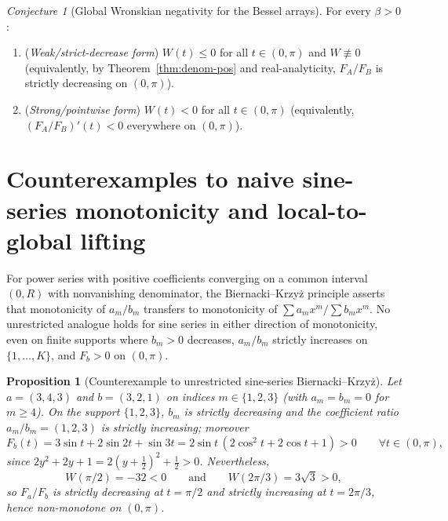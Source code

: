 \documentclass[11pt]{article}
\newtheorem{proposition}[theorem]{Proposition}
\theoremstyle{remark}
\newtheorem{conjecture}[theorem]{Conjecture}
\begin{document}
\begin{conjecture}[Global Wronskian negativity for the Bessel arrays]
\label{conj:main}
For every $\beta > 0$:
\begin{enumerate}
  \item[(a)] (\emph{Weak/strict-decrease form}) $W(t) \le 0$ for all $t \in (0,\pi)$ and
  $W \not\equiv 0$ (equivalently, by Theorem~\ref{thm:denom-pos} and real-analyticity,
  $F_A/F_B$ is strictly decreasing on $(0,\pi)$).
  \item[(b)] (\emph{Strong/pointwise form}) $W(t) < 0$ for all $t \in (0,\pi)$
  (equivalently, $(F_A/F_B)'(t) < 0$ everywhere on $(0,\pi)$).
\end{enumerate}
\end{conjecture}

\section{Counterexamples to naive sine-series monotonicity and local-to-global lifting}
\label{sec:counter}

For power series with positive coefficients converging on a common interval $(0,R)$ with
nonvanishing denominator, the Biernacki--Krzy\.z principle \cite{BK} asserts that
monotonicity of $a_m/b_m$ transfers to monotonicity of $\sum a_m x^m / \sum b_m x^m$.
No unrestricted analogue holds for sine series in either direction of monotonicity, even
on finite supports where $b_m > 0$ decreases, $a_m/b_m$ strictly increases on $\{1,\dots,K\}$,
and $F_b > 0$ on $(0,\pi)$.

\begin{proposition}[Counterexample to unrestricted sine-series Biernacki--Krzy\.z]
\label{prop:counter}
Let $a = (3, 4, 3)$ and $b = (3, 2, 1)$ on indices $m \in \{1,2,3\}$ (with $a_m = b_m = 0$
for $m \ge 4$). On the support $\{1,2,3\}$, $b_m$ is strictly decreasing and the coefficient
ratio $a_m/b_m = (1,2,3)$ is strictly increasing; moreover
\[
F_b(t) = 3\sin t + 2\sin 2t + \sin 3t
= 2\sin t\,(2\cos^2 t + 2\cos t + 1) > 0 \qquad \forall t \in (0,\pi),
\]
since $2y^2 + 2y + 1 = 2(y + \tfrac{1}{2})^2 + \tfrac{1}{2} > 0$. Nevertheless,
\[
W(\pi/2) = -32 < 0
\qquad\text{and}\qquad
W(2\pi/3) = 3\sqrt{3} > 0,
\]
so $F_a/F_b$ is strictly decreasing at $t = \pi/2$ and strictly increasing at $t = 2\pi/3$,
hence non-monotone on $(0,\pi)$.
\end{proposition}
\end{document}
